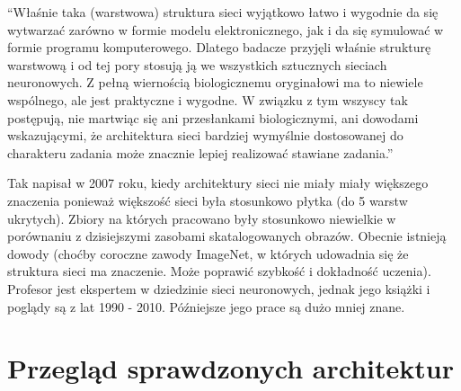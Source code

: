 \documentclass[a4paper,twoside,titlepage,openright]{book}
\begin{document}
“Właśnie taka (warstwowa) struktura sieci wyjątkowo łatwo i wygodnie da się wytwarzać zarówno w formie modelu elektronicznego, jak i da się symulować w formie programu komputerowego. Dlatego badacze przyjęli właśnie strukturę warstwową i od tej pory stosują ją we wszystkich sztucznych sieciach neuronowych. Z pełną wiernością biologicznemu oryginałowi ma to niewiele wspólnego, ale jest praktyczne i wygodne. W związku z tym wszyscy tak postępują, nie martwiąc się ani przesłankami biologicznymi, ani dowodami wskazującymi, że architektura sieci bardziej wymyślnie dostosowanej do charakteru zadania może znacznie lepiej realizować stawiane zadania.”

Tak napisał w 2007 roku, kiedy architektury sieci nie miały miały większego znaczenia ponieważ większość sieci była stosunkowo płytka (do 5 warstw ukrytych). Zbiory na których pracowano były stosunkowo niewielkie w porównaniu z dzisiejszymi zasobami skatalogowanych obrazów. 
Obecnie istnieją dowody (choćby coroczne zawody ImageNet, w których udowadnia się że struktura sieci ma znaczenie. Może poprawić szybkość i dokładność uczenia). Profesor jest ekspertem w dziedzinie sieci neuronowych, jednak jego książki i poglądy są z lat 1990 - 2010. Późniejsze jego prace są dużo mniej znane.

\section{Przegląd sprawdzonych architektur}
\end{document}
